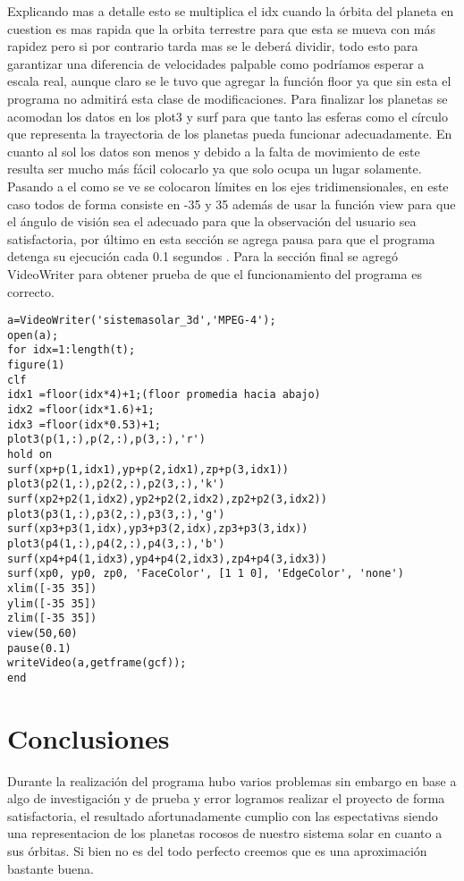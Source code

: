 \documentclass[12pt]{article}
\begin{document}
Explicando mas a detalle esto se multiplica el idx cuando la órbita del planeta en cuestion es mas rapida que la orbita terrestre para que esta se mueva con más rapidez pero si por contrario tarda mas se le deberá dividir, todo esto para garantizar una diferencia de velocidades palpable como podríamos esperar a escala real, aunque claro se le tuvo que agregar la función floor ya que sin esta el programa no admitirá esta clase de modificaciones.
Para finalizar los planetas se acomodan los datos en los plot3 y surf para que tanto las esferas como el círculo que representa la trayectoria de los planetas pueda funcionar adecuadamente.
En cuanto al sol los datos son menos y debido a la falta de movimiento de este resulta ser mucho más fácil colocarlo ya que solo ocupa un lugar solamente.
Pasando a el como se ve se colocaron límites en los ejes tridimensionales, en este caso todos de forma consiste en -35 y 35 además de usar la función view para que el ángulo de visión sea el adecuado para que la observación del usuario sea satisfactoria, por último en esta sección se agrega pausa para que el programa detenga su ejecución cada 0.1 segundos .
Para la sección final se agregó VideoWriter para obtener prueba de que el funcionamiento del programa es correcto.
\begin{lstlisting}
a=VideoWriter('sistemasolar_3d','MPEG-4');
open(a);
for idx=1:length(t);
figure(1)
clf
idx1 =floor(idx*4)+1;(floor promedia hacia abajo)
idx2 =floor(idx*1.6)+1;
idx3 =floor(idx*0.53)+1;
plot3(p(1,:),p(2,:),p(3,:),'r')
hold on
surf(xp+p(1,idx1),yp+p(2,idx1),zp+p(3,idx1))
plot3(p2(1,:),p2(2,:),p2(3,:),'k')
surf(xp2+p2(1,idx2),yp2+p2(2,idx2),zp2+p2(3,idx2))
plot3(p3(1,:),p3(2,:),p3(3,:),'g')
surf(xp3+p3(1,idx),yp3+p3(2,idx),zp3+p3(3,idx))
plot3(p4(1,:),p4(2,:),p4(3,:),'b')
surf(xp4+p4(1,idx3),yp4+p4(2,idx3),zp4+p4(3,idx3))
surf(xp0, yp0, zp0, 'FaceColor', [1 1 0], 'EdgeColor', 'none')
xlim([-35 35])
ylim([-35 35])
zlim([-35 35])
view(50,60)
pause(0.1)
writeVideo(a,getframe(gcf));
end
\end{lstlisting}
	\section{Conclusiones}
	Durante la realización del programa hubo varios problemas sin embargo en base a algo de investigación y de prueba y error logramos realizar el proyecto de forma satisfactoria, el resultado afortunadamente cumplio con las espectativas siendo una representacion de los planetas rocosos de nuestro sistema solar en cuanto a sus órbitas. Si bien no es del todo perfecto creemos que es una aproximación bastante buena.
	
\end{document}
